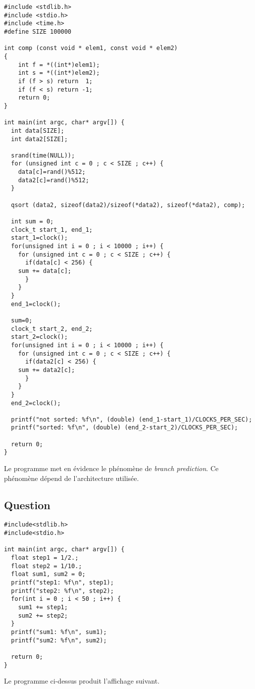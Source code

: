 \documentclass[11pt]{article}
\newcounter{questionc}
\newcommand{\question}{\stepcounter{questionc}\subsection{Question \thequestionc}}
\begin{document}
\begin{verbatim}
#include <stdlib.h>
#include <stdio.h>
#include <time.h>
#define SIZE 100000

int comp (const void * elem1, const void * elem2)
{
    int f = *((int*)elem1);
    int s = *((int*)elem2);
    if (f > s) return  1;
    if (f < s) return -1;
    return 0;
}

int main(int argc, char* argv[]) {
  int data[SIZE];
  int data2[SIZE];

  srand(time(NULL));
  for (unsigned int c = 0 ; c < SIZE ; c++) {
    data[c]=rand()%512;
    data2[c]=rand()%512;
  }

  qsort (data2, sizeof(data2)/sizeof(*data2), sizeof(*data2), comp);

  int sum = 0;
  clock_t start_1, end_1;
  start_1=clock();
  for(unsigned int i = 0 ; i < 10000 ; i++) {
    for (unsigned int c = 0 ; c < SIZE ; c++) {
      if(data[c] < 256) {
	sum += data[c];
      }
    }
  }
  end_1=clock();

  sum=0;
  clock_t start_2, end_2;
  start_2=clock();
  for(unsigned int i = 0 ; i < 10000 ; i++) {
    for (unsigned int c = 0 ; c < SIZE ; c++) {
      if(data2[c] < 256) {
	sum += data2[c];
      }
    }
  }
  end_2=clock();

  printf("not sorted: %f\n", (double) (end_1-start_1)/CLOCKS_PER_SEC);
  printf("sorted: %f\n", (double) (end_2-start_2)/CLOCKS_PER_SEC);

  return 0;
}

\end{verbatim}

\begin{solution}
  Le programme met en évidence le phénomène de \textit{branch prediction}. Ce phénomène dépend de l'architecture utilisée.
\end{solution}

\question

\begin{verbatim}
#include<stdlib.h>
#include<stdio.h>

int main(int argc, char* argv[]) {
  float step1 = 1/2.;
  float step2 = 1/10.;
  float sum1, sum2 = 0;
  printf("step1: %f\n", step1);
  printf("step2: %f\n", step2);
  for(int i = 0 ; i < 50 ; i++) {
    sum1 += step1;
    sum2 += step2;
  }
  printf("sum1: %f\n", sum1);
  printf("sum2: %f\n", sum2);

  return 0;
}
\end{verbatim}

Le programme ci-dessus produit l'affichage suivant.
\end{document}
